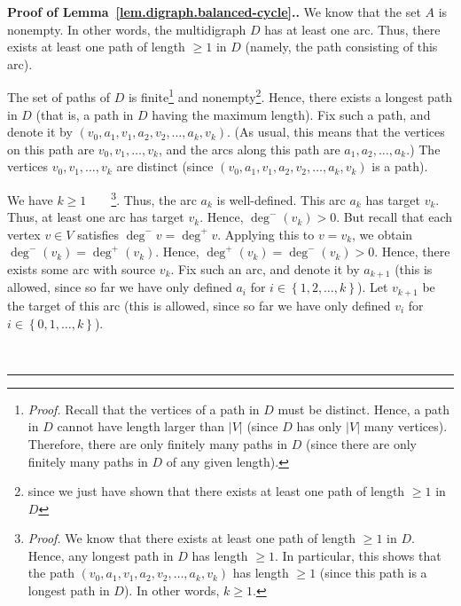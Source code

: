 \documentclass[numbers=enddot,12pt,final,onecolumn,notitlepage]{scrartcl}%
\theoremstyle{definition}
\newenvironment{proof}[1][Proof]{\noindent\textbf{#1.} }{\ \rule{0.5em}{0.5em}}
\newcommand{\set}[1]{\left\{ #1 \right\}}
\newcommand{\abs}[1]{\left| #1 \right|}
\newcommand{\tup}[1]{\left( #1 \right)}
\begin{document}
\begin{proof}[Proof of Lemma~\ref{lem.digraph.balanced-cycle}.]
We know that the set $A$ is nonempty.
In other words, the multidigraph $D$ has at least one arc.
Thus, there exists at least one path of
length $\geq 1$ in $D$ (namely, the path consisting of this arc).

The set of paths of $D$ is finite\footnote{\textit{Proof.} Recall that
the vertices of a path in $D$ must be distinct. Hence, a path in $D$
cannot have length larger than $\abs{V}$ (since $D$ has only $\abs{V}$
many vertices). Therefore, there are only finitely many paths in $D$
(since there are only finitely many paths in $D$ of any given
length).} and nonempty\footnote{since we just have shown that
there exists at least one path of length $\geq 1$ in $D$}. Hence,
there exists a longest path in $D$ (that is, a path in $D$ having the
maximum length). Fix such a path, and denote it by
$\tup{v_0, a_1, v_1, a_2, v_2, \ldots, a_k, v_k}$. (As usual, this
means that the vertices on this path are $v_0, v_1, \ldots, v_k$, and
the arcs along this path are $a_1, a_2, \ldots, a_k$.) The vertices
$v_0, v_1, \ldots, v_k$ are distinct (since
$\tup{v_0, a_1, v_1, a_2, v_2, \ldots, a_k, v_k}$ is a path).

We have $k \geq 1$\ \ \ \ \footnote{\textit{Proof.}
  We know that there exists at least one path of
  length $\geq 1$ in $D$.
  Hence, any longest path in $D$ has length $\geq 1$.
  In particular, this shows that the path
  $\tup{v_0, a_1, v_1, a_2, v_2, \ldots, a_k, v_k}$ has length
  $\geq 1$ (since this path is a longest path in $D$).
  In other words, $k \geq 1$.}.
Thus, the arc $a_k$ is well-defined.
This arc $a_k$ has target $v_k$. Thus, at least one arc has target
$v_k$. Hence, $\deg^- \tup{v_k} > 0$. But recall that
each vertex $v \in V$ satisfies $\deg^- v = \deg^+ v$. Applying this
to $v = v_k$, we obtain $\deg^- \tup{v_k} = \deg^+ \tup{v_k}$.
Hence, $\deg^+ \tup{v_k} = \deg^- \tup{v_k} > 0$. Hence, there exists
some arc with source $v_k$. Fix such an arc, and denote it by
$a_{k+1}$ (this is allowed, since so far we have only defined $a_i$
for $i \in \set{1, 2, \ldots, k}$).
Let $v_{k+1}$ be the target of this arc (this is allowed, since so far
we have only defined $v_i$ for $i \in \set{0, 1, \ldots, k}$).


\end{proof}
\end{document}
